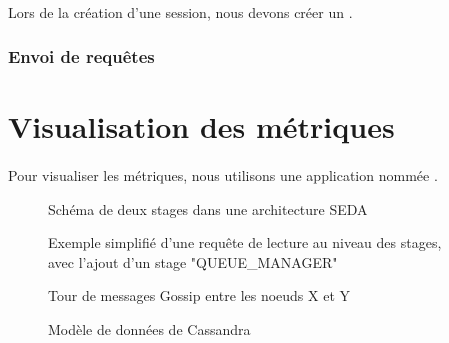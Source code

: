 \documentclass[12pt]{article}
\begin{document}
\paragraph{} Lors de la création d'une session, nous devons créer un .
\subsubsection{Envoi de requêtes}


\newpage


\section{Visualisation des métriques}

\paragraph{} Pour visualiser les métriques, nous utilisons une application nommée .

\newpage



\begin{figure}[p]
	\centering
		
	\caption{Schéma de deux stages dans une architecture SEDA \label{fig:stages}}
\end{figure}

\begin{figure}[p]
	\centering
		
	\caption{Exemple simplifié d'une requête de lecture au niveau des stages, avec l'ajout d'un stage "QUEUE\_MANAGER" \label{fig:read_request}}
\end{figure}

\begin{figure}[p]
	\centering
		
	\caption{Tour de messages Gossip entre les noeuds X et Y \label{fig:round_gossip}}
\end{figure}

\begin{figure}[p]
	\centering
		
	\caption{Modèle de données de Cassandra \label{fig:keyspace}}
\end{figure}
\end{document}
